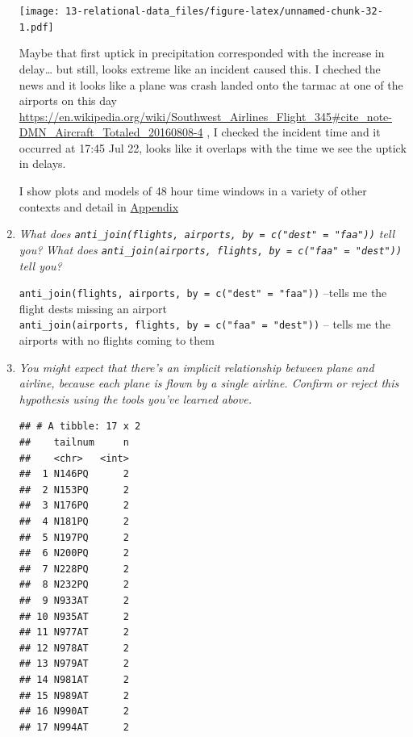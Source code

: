 \documentclass[]{book}
\newenvironment{Shaded}{\begin{snugshade}}{\end{snugshade}}
\newcommand{\DataTypeTok}[1]{\textcolor[rgb]{0.13,0.29,0.53}{#1}}
\newcommand{\DecValTok}[1]{\textcolor[rgb]{0.00,0.00,0.81}{#1}}
\newcommand{\KeywordTok}[1]{\textcolor[rgb]{0.13,0.29,0.53}{\textbf{#1}}}
\newcommand{\NormalTok}[1]{#1}
\newcommand{\OperatorTok}[1]{\textcolor[rgb]{0.81,0.36,0.00}{\textbf{#1}}}
\newcommand{\OtherTok}[1]{\textcolor[rgb]{0.56,0.35,0.01}{#1}}
\newcommand{\StringTok}[1]{\textcolor[rgb]{0.31,0.60,0.02}{#1}}
\theoremstyle{definition}
\theoremstyle{definition}
\theoremstyle{definition}
\theoremstyle{remark}
\begin{document}
\begin{enumerate}
  \texttt{[image: 13-relational-data\_files/figure-latex/unnamed-chunk-32-1.pdf]}

  Maybe that first uptick in precipitation corresponded with the
  increase in delay\ldots{} but still, looks extreme like an incident
  caused this. I cheched the news and it looks like a plane was crash
  landed onto the tarmac at one of the airports on this day
  \url{https://en.wikipedia.org/wiki/Southwest_Airlines_Flight_345\#cite_note-DMN_Aircraft_Totaled_20160808-4}
  , I checked the incident time and it occurred at 17:45 Jul 22, looks
  like it overlaps with the time we see the uptick in delays.

  I show plots and models of 48 hour time windows in a variety of other
  contexts and detail in \protect\hyperlink{appendix-10}{Appendix}
\item
  \emph{What does
  \texttt{anti\_join(flights,\ airports,\ by\ =\ c("dest"\ =\ "faa"))}
  tell you?} \emph{What does
  \texttt{anti\_join(airports,\ flights,\ by\ =\ c("faa"\ =\ "dest"))}
  tell you?}

  \texttt{anti\_join(flights,\ airports,\ by\ =\ c("dest"\ =\ "faa"))}
  --tells me the flight dests missing an airport
  \texttt{anti\_join(airports,\ flights,\ by\ =\ c("faa"\ =\ "dest"))}
  -- tells me the airports with no flights coming to them
\item
  \emph{You might expect that there's an implicit relationship between
  plane} \emph{and airline, because each plane is flown by a single
  airline. Confirm} \emph{or reject this hypothesis using the tools
  you've learned above.}

\begin{Shaded}
\end{Shaded}

\begin{verbatim}
## # A tibble: 17 x 2
##    tailnum     n
##    <chr>   <int>
##  1 N146PQ      2
##  2 N153PQ      2
##  3 N176PQ      2
##  4 N181PQ      2
##  5 N197PQ      2
##  6 N200PQ      2
##  7 N228PQ      2
##  8 N232PQ      2
##  9 N933AT      2
## 10 N935AT      2
## 11 N977AT      2
## 12 N978AT      2
## 13 N979AT      2
## 14 N981AT      2
## 15 N989AT      2
## 16 N990AT      2
## 17 N994AT      2
\end{verbatim}


\end{enumerate}
\end{document}
